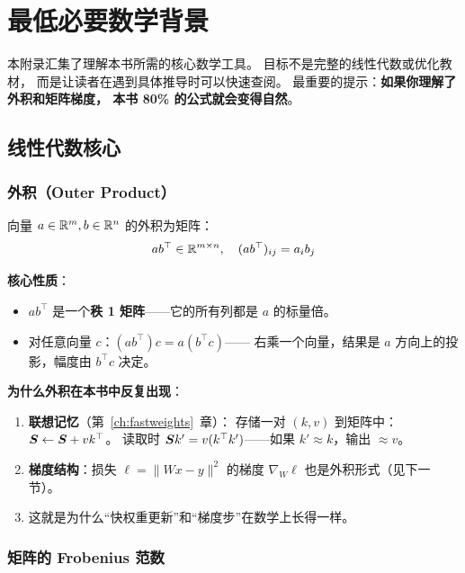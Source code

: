 \chapter{最低必要数学背景}
\label{app:math}

本附录汇集了理解本书所需的核心数学工具。
目标不是完整的线性代数或优化教材，
而是让读者在遇到具体推导时可以快速查阅。
最重要的提示：\textbf{如果你理解了外积和矩阵梯度，
本书 80\% 的公式就会变得自然}。

\section{线性代数核心}

\subsection{外积（Outer Product）}

向量 $a \in \mathbb{R}^m, b \in \mathbb{R}^n$ 的外积为矩阵：
\[
  a b^\top \in \mathbb{R}^{m \times n}, \quad (ab^\top)_{ij} = a_i b_j
\]

\textbf{核心性质}：
\begin{itemize}
  \item $ab^\top$ 是一个\textbf{秩 1 矩阵}——它的所有列都是 $a$ 的标量倍。
  \item 对任意向量 $c$：$(ab^\top) c = a (b^\top c)$——
    右乘一个向量，结果是 $a$ 方向上的投影，幅度由 $b^\top c$ 决定。
\end{itemize}

\textbf{为什么外积在本书中反复出现}：
\begin{enumerate}
  \item \textbf{联想记忆}（第~\ref{ch:fastweights}~章）：
    存储一对 $(k, v)$ 到矩阵中：$\boldsymbol{S} \leftarrow \boldsymbol{S} + v k^\top$。
    读取时 $\boldsymbol{S} k' = v(k^\top k')$——如果 $k' \approx k$，输出 $\approx v$。
  \item \textbf{梯度结构}：损失 $\ell = \|Wx - y\|^2$ 的梯度 $\nabla_W \ell$
    也是外积形式（见下一节）。
  \item 这就是为什么``快权重更新''和``梯度步''在数学上长得一样。
\end{enumerate}

\subsection{矩阵的 Frobenius 范数}

